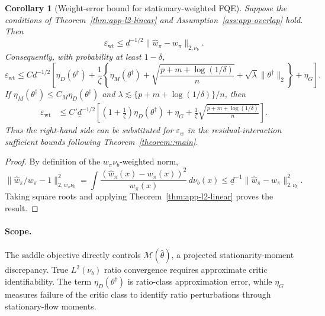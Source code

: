 \documentclass{article}
\theoremstyle{plain}
\newtheorem{corollary}{Corollary}
\theoremstyle{definition}
\theoremstyle{remark}
\begin{document}
\begin{corollary}[Weight-error bound for stationary-weighted FQE]
\label{cor:app-fqe-weight-error}
Suppose the conditions of Theorem~\ref{thm:app-l2-linear} and
Assumption~\ref{ass:app-overlap} hold. Then
\[
\varepsilon_{\mathrm{wt}}
\le
\underline d^{-1/2}\|\widehat w_\pi-w_\pi\|_{2,\nu_b}.
\]
Consequently, with probability at least \(1-\delta\),
\[
\varepsilon_{\mathrm{wt}}
\le
C\underline d^{-1/2}
\left[
\eta_D(\theta^\dagger)
+\frac{1}{\zeta}
\left\{
\eta_M(\theta^\dagger)
+\sqrt{\frac{p+m+\log(1/\delta)}{n}}
+\sqrt{\lambda}\|\theta^\dagger\|_2
\right\}
+\eta_G
\right].
\]
If \(\eta_M(\theta^\dagger)\le C_M\eta_D(\theta^\dagger)\) and
\(\lambda\lesssim \{p+m+\log(1/\delta)\}/n\), then
\[
\begin{aligned}
\varepsilon_{\mathrm{wt}}
&\le
C'\underline d^{-1/2}
\left[
\left(1+\frac{1}{\zeta}\right)\eta_D(\theta^\dagger)
+\eta_G
+\frac{1}{\zeta}
\sqrt{\frac{p+m+\log(1/\delta)}{n}}
\right].
\end{aligned}
\]
Thus the right-hand side can be substituted for \(\varepsilon_w\) in the
residual-interaction sufficient bounds following Theorem~\ref{theorem::main}.
\end{corollary}

\begin{proof}
By definition of the \(w_\pi\nu_b\)-weighted norm,
\[
\|\widehat w_\pi/w_\pi-1\|_{2,w_\pi\nu_b}^2
=
\int
\frac{(\widehat w_\pi(x)-w_\pi(x))^2}{w_\pi(x)}
\,d\nu_b(x)
\le
\underline d^{-1}\|\widehat w_\pi-w_\pi\|_{2,\nu_b}^2 .
\]
Taking square roots and applying Theorem~\ref{thm:app-l2-linear} proves the
result.
\end{proof}

\paragraph{Scope.}
The saddle objective directly controls \(\mathcal M(\widehat\theta)\), a
projected stationarity-moment discrepancy. True \(L^2(\nu_b)\) ratio
convergence requires approximate critic identifiability. The term
\(\eta_D(\theta^\dagger)\) is ratio-class approximation error, while
\(\eta_G\) measures failure of the critic class to identify ratio perturbations
through stationary-flow moments.  
\end{document}
